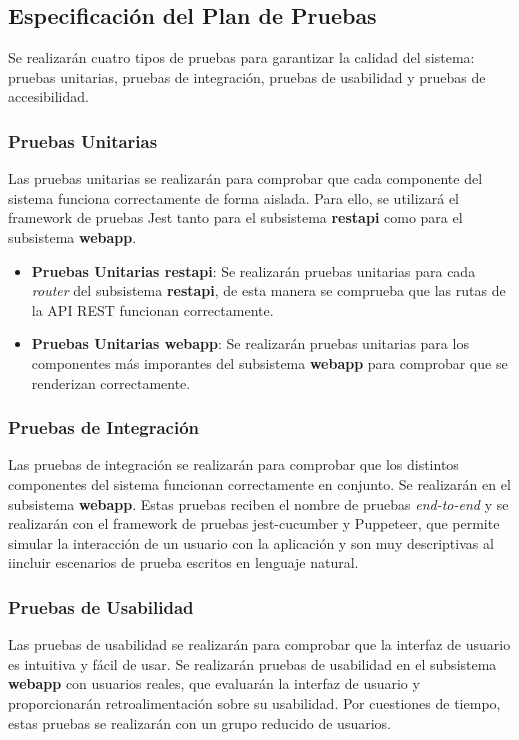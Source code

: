 \subsection{Especificación del Plan de Pruebas}
Se realizarán cuatro tipos de pruebas para garantizar la calidad del sistema: pruebas unitarias, pruebas de integración, pruebas de usabilidad y pruebas de accesibilidad.
\subsubsection{Pruebas Unitarias}
Las pruebas unitarias se realizarán para comprobar que cada componente del sistema funciona correctamente de forma aislada.
Para ello, se utilizará el framework de pruebas Jest tanto para el subsistema \textbf{restapi} como para el subsistema \textbf{webapp}.
\begin{itemize}
    \item \textbf{Pruebas Unitarias restapi}: Se realizarán pruebas unitarias para cada \textit{router} del subsistema \textbf{restapi}, de esta manera se comprueba que las rutas de la API REST funcionan correctamente.
    \item \textbf{Pruebas Unitarias webapp}: Se realizarán pruebas unitarias para los componentes más imporantes del subsistema \textbf{webapp} para comprobar que se renderizan correctamente.
\end{itemize}

\subsubsection{Pruebas de Integración}
Las pruebas de integración se realizarán para comprobar que los distintos componentes del sistema funcionan correctamente en conjunto.
Se realizarán en el subsistema \textbf{webapp}. Estas pruebas reciben el nombre de pruebas \textit{end-to-end} y se realizarán con el framework de 
pruebas jest-cucumber y Puppeteer, que permite simular la interacción de un usuario con la aplicación y son muy descriptivas al iincluir escenarios de prueba escritos en lenguaje natural.

\subsubsection{Pruebas de Usabilidad}
Las pruebas de usabilidad se realizarán para comprobar que la interfaz de usuario es intuitiva y fácil de usar.
Se realizarán pruebas de usabilidad en el subsistema \textbf{webapp} con usuarios reales, que evaluarán la interfaz de usuario y proporcionarán retroalimentación sobre su usabilidad.
Por cuestiones de tiempo, estas pruebas se realizarán con un grupo reducido de usuarios.

